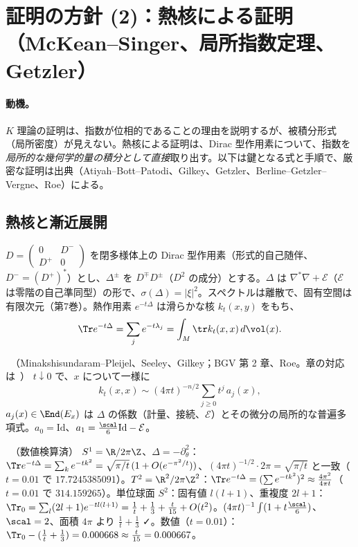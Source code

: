 \section{証明の方針 (2)：熱核による証明（McKean--Singer、局所指数定理、Getzler）}\label{sec:heat}
\paragraph{動機。}$K$ 理論の証明は、指数が位相的であることの理由を説明するが、被積分形式（局所密度）が見えない。熱核による証明は、Dirac 型作用素について、指数を\emph{局所的な幾何学的量の積分として直接}取り出す。以下は鍵となる式と手順で、厳密な証明は出典（Atiyah--Bott--Patodi、Gilkey、Getzler、Berline--Getzler--Vergne、Roe）による。

\subsection{熱核と漸近展開}
$D=\begin{pmatrix}0&D^-\\D^+&0\end{pmatrix}$ を閉多様体上の Dirac 型作用素（形式的自己随伴、$D^-=(D^+)^*$）とし、$\Delta^\pm$ を $D^\mp D^\pm$（$D^2$ の成分）とする。$\Delta$ は $\nabla^*\nabla+\mathcal E$（$\mathcal E$ は零階の自己準同型）の形で、$\sigma(\Delta)=|\xi|^2$。スペクトルは離散で、固有空間は有限次元（第7巻）。熱作用素 $e^{-t\Delta}$ は滑らかな核 $k_t(x,y)$ をもち、
\[
\Tr e^{-t\Delta}=\sum_je^{-t\lambda_j}=\int_M\tr k_t(x,x)\,d\vol(x).
\]
\begin{thm}[熱核の漸近展開]\label{thm:heatasym}\tC\ （Minakshisundaram--Pleijel、Seeley、Gilkey；BGV 第 2 章、Roe。章の対応は\tQ\ ）
$t\downarrow0$ で、$x$ について一様に
\[
k_t(x,x)\sim(4\pi t)^{-n/2}\sum_{j\ge0}t^j\,a_j(x),
\]
$a_j(x)\in\End(E_x)$ は $\Delta$ の係数（計量、接続、$\mathcal E$）とその微分の局所的な普遍多項式。$a_0=\mathrm{Id}$、$a_1=\frac{\scal}6\mathrm{Id}-\mathcal E$。
\end{thm}
\begin{ex}\label{ex:heatS2}\tP\ （数値検算済）
$S^1=\R/2\pi\Z$、$\Delta=-\partial_\theta^2$：$\Tr e^{-t\Delta}=\sum_ke^{-tk^2}=\sqrt{\pi/t}\,(1+O(e^{-\pi^2/t}))$、$(4\pi t)^{-1/2}\cdot2\pi=\sqrt{\pi/t}$ と一致（$t=0.01$ で $17.7245385091$）。$T^2=\R^2/2\pi\Z^2$：$\Tr e^{-t\Delta}=(\sum e^{-tk^2})^2\approx\frac{4\pi^2}{4\pi t}$（$t=0.01$ で $314.159265$）。単位球面 $S^2$：固有値 $l(l+1)$、重複度 $2l+1$：$\Tr_0=\sum_l(2l+1)e^{-tl(l+1)}=\frac1t+\frac13+\frac t{15}+O(t^2)$。$(4\pi t)^{-1}\int(1+t\frac{\scal}6)$、$\scal=2$、面積 $4\pi$ より $\frac1t+\frac13$ ✓。数値（$t=0.01$）：$\Tr_0-(\frac1t+\frac13)=0.000668\approx\frac t{15}=0.000667$。
\end{ex}

